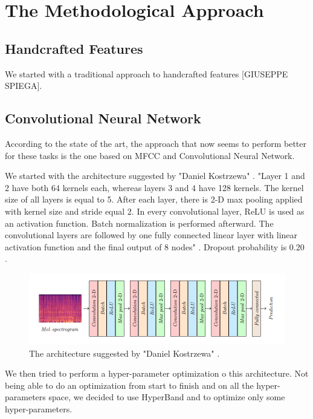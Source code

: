 \section{The Methodological Approach}

\subsection{Handcrafted Features}
We started with a traditional approach to handcrafted features [GIUSEPPE SPIEGA].

\subsection{Convolutional Neural Network}
According to the state of the art, the approach that now seems to perform better for these tasks is the one based on MFCC and Convolutional Neural Network. 

We started with the architecture suggested by "Daniel Kostrzewa" \cite{kostrzewa2021music}.
"Layer 1 and 2 have both 64 kernels each, whereas layers 3 and 4 have 128 kernels. The kernel size of all layers is equal to 5. After each layer, there is 2-D max pooling applied with kernel size and stride equal 2. In every convolutional layer, ReLU is used as an activation function. Batch normalization is performed afterward. The convolutional layers are followed by one fully connected linear layer with linear activation function and the final output of 8 nodes" \cite{kostrzewa2021music}. Dropout probability is 0.20 .

\begin{figure}[ht]
\centering
\includegraphics[scale=0.6]{images/CNN-architecture.png}
\caption{The architecture suggested by "Daniel Kostrzewa" \cite{kostrzewa2021music}.}
\label{fig:GP_Acq}
\end{figure}

We then tried to perform a hyper-parameter optimization o this architecture.
Not being able to do an optimization from start to finish and on all the hyper-parameters space, we decided to use HyperBand and to optimize only some hyper-parameters.

